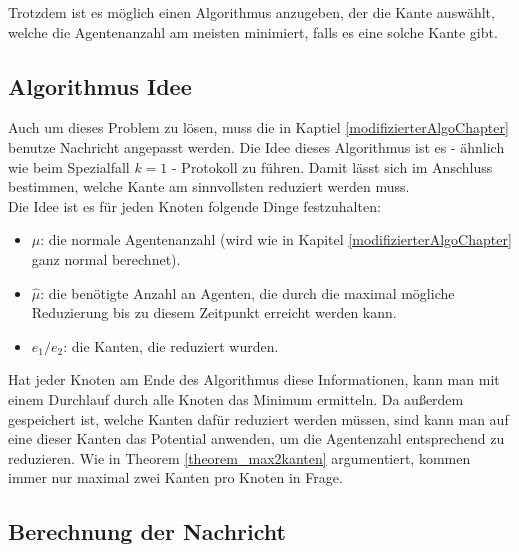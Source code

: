 Trotzdem ist es möglich einen Algorithmus anzugeben, der die Kante auswählt, welche die Agentenanzahl am meisten minimiert, falls es eine solche Kante gibt.


\subsection*{Algorithmus Idee}

	Auch um dieses Problem zu lösen, muss die in Kaptiel \ref{modifizierterAlgoChapter} benutze Nachricht angepasst werden. Die Idee dieses Algorithmus ist es - ähnlich wie beim Spezialfall $k = 1$ -  Protokoll zu führen. Damit lässt sich im Anschluss bestimmen, welche Kante am sinnvollsten reduziert werden muss.\\
	Die Idee ist es für jeden Knoten folgende Dinge festzuhalten: 
	\begin{itemize}
		\item $\mu$: die normale Agentenanzahl (wird wie in Kapitel \ref{modifizierterAlgoChapter} ganz normal berechnet).
		\item $\hat{\mu}$: die benötigte Anzahl an  Agenten, die durch die maximal mögliche Reduzierung bis zu diesem Zeitpunkt erreicht werden kann.
		\item $e_{1} / e_{2}$: die Kanten, die reduziert wurden.
	\end{itemize}
	Hat jeder Knoten am Ende des Algorithmus diese Informationen, kann man mit einem Durchlauf durch alle Knoten das Minimum ermitteln. Da außerdem gespeichert ist, welche Kanten dafür reduziert werden müssen, sind kann man auf eine dieser Kanten das Potential anwenden, um die Agentenzahl entsprechend zu reduzieren. Wie in Theorem \ref{theorem_max2kanten} argumentiert, kommen immer nur maximal zwei Kanten pro Knoten in Frage.
	
	\subsection*{Berechnung der Nachricht}
	
